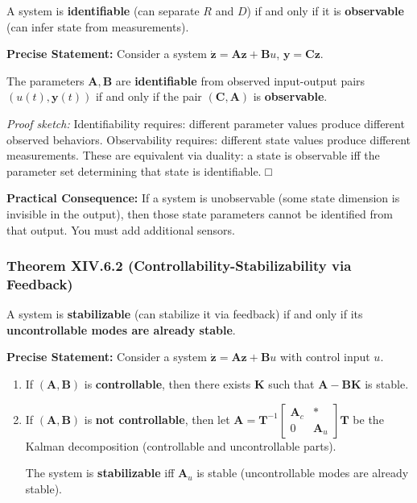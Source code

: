 \documentclass[
]{article}
\begin{document}
A system is \textbf{identifiable} (can separate \(R\) and \(D\)) if and
only if it is \textbf{observable} (can infer state from measurements).

\textbf{Precise Statement:} Consider a system
\(\dot{\mathbf{z}} = \mathbf{A}\mathbf{z} + \mathbf{B}u\),
\(\mathbf{y} = \mathbf{C}\mathbf{z}\).

The parameters \(\mathbf{A}, \mathbf{B}\) are \textbf{identifiable} from
observed input-output pairs \((u(t), \mathbf{y}(t))\) if and only if the
pair \((\mathbf{C}, \mathbf{A})\) is \textbf{observable}.

\emph{Proof sketch:} Identifiability requires: different parameter
values produce different observed behaviors. Observability requires:
different state values produce different measurements. These are
equivalent via duality: a state is observable iff the parameter set
determining that state is identifiable. □

\textbf{Practical Consequence:} If a system is unobservable (some state
dimension is invisible in the output), then those state parameters
cannot be identified from that output. You must add additional sensors.

\subsubsection{Theorem XIV.6.2 (Controllability-Stabilizability via
Feedback)}\label{theorem-xiv.6.2-controllability-stabilizability-via-feedback}

A system is \textbf{stabilizable} (can stabilize it via feedback) if and
only if its \textbf{uncontrollable modes are already stable}.

\textbf{Precise Statement:} Consider a system
\(\dot{\mathbf{z}} = \mathbf{A}\mathbf{z} + \mathbf{B}u\) with control
input \(u\).

\begin{enumerate}
\def\labelenumi{\arabic{enumi}.}
\item
  If \((\mathbf{A}, \mathbf{B})\) is \textbf{controllable}, then there
  exists \(\mathbf{K}\) such that \(\mathbf{A} - \mathbf{BK}\) is
  stable.
\item
  If \((\mathbf{A}, \mathbf{B})\) is \textbf{not controllable}, then let
  \(\mathbf{A} = \mathbf{T}^{-1} \begin{bmatrix} \mathbf{A}_{c} & * \\ 0 & \mathbf{A}_{u} \end{bmatrix} \mathbf{T}\)
  be the Kalman decomposition (controllable and uncontrollable parts).

  The system is \textbf{stabilizable} iff \(\mathbf{A}_{u}\) is stable
  (uncontrollable modes are already stable).
\end{enumerate}
\end{document}
